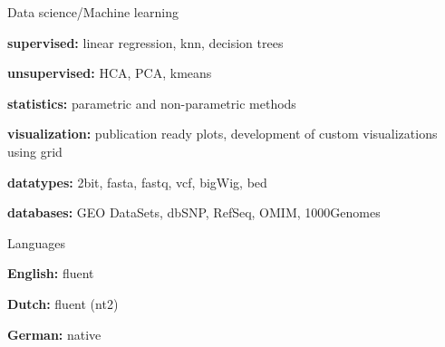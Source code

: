 \begin{cvskills}
  \cvskill
    {Data science/Machine learning}%
    {
      \begin{cvitems}
        \item {\textbf{supervised:} linear regression, knn, decision trees}
        \item {\textbf{unsupervised:} HCA, PCA, kmeans}
        \item {\textbf{statistics:} parametric and non-parametric methods}
        \item {\textbf{visualization:} publication ready plots, development of custom visualizations using grid}
        \item {\textbf{datatypes:} 2bit, fasta, fastq, vcf, bigWig, bed}
        \item {\textbf{databases:} GEO DataSets, dbSNP, RefSeq, OMIM, 1000Genomes}
      \end{cvitems}
    }
  \cvskill
    {Languages} %
    {
      \begin{cvitems}
        \item {\textbf{English:} fluent}
        \item {\textbf{Dutch:} fluent (nt2)}
        \item {\textbf{German:} native}
      \end{cvitems}
    }
\end{cvskills}
